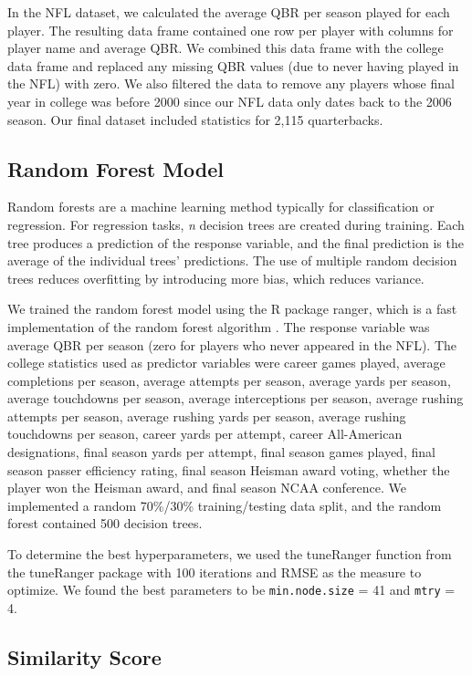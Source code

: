 \documentclass{article}
\begin{document}
In the NFL dataset, we calculated the average QBR per season played for each player. The resulting data frame contained one row per player with columns for player name and average QBR. We combined this data frame with the college data frame and replaced any missing QBR values (due to never having played in the NFL) with zero. We also filtered the data to remove any players whose final year in college was before 2000 since our NFL data only dates back to the 2006 season. Our final dataset included statistics for 2,115 quarterbacks.

\subsection{Random Forest Model}

Random forests are a machine learning method typically for classification or regression. For regression tasks, \textit{n} decision trees are created during training. Each tree produces a prediction of the response variable, and the final prediction is the average of the individual trees' predictions. The use of multiple random decision trees reduces overfitting by introducing more bias, which reduces variance.

We trained the random forest model using the R package ranger, which is a fast implementation of the random forest algorithm \citep{wright_ranger_2015}. The response variable was average QBR per season (zero for players who never appeared in the NFL). The college statistics used as predictor variables were career games played, average completions per season, average attempts per season, average yards per season, average touchdowns per season, average interceptions per season, average rushing attempts per season, average rushing yards per season, average rushing touchdowns per season, career yards per attempt, career All-American designations, final season yards per attempt, final season games played, final season passer efficiency rating, final season Heisman award voting, whether the player won the Heisman award, and final season NCAA conference. We implemented a random 70\%/30\% training/testing data split, and the random forest contained 500 decision trees.

To determine the best hyperparameters, we used the tuneRanger function from the tuneRanger package \citep{probst_tuneranger_2018} with 100 iterations and RMSE as the measure to optimize. We found the best parameters to be \texttt{min.node.size} = 41 and \texttt{mtry} = 4.

\subsection{Similarity Score}
\end{document}

